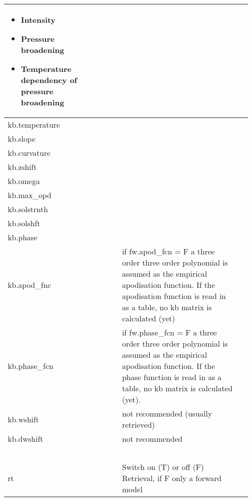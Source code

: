 \documentclass{article}
\newcommand\liststyleWWviiiNumii{%
\renewcommand\labelitemi{{\textbullet}}
\renewcommand\labelitemii{${\circ}$}
\renewcommand\labelitemiii{${\blacksquare}$}
\renewcommand\labelitemiv{{\textbullet}}
}
\begin{document}
{\begin{flushleft}
\begin{supertabular}{|m{2.10666in}|m{1.7969599in}|m{0.6087598in}m{0.54345983in}|m{5.30046in}|m{0.74065983in}|}
\liststyleWWviiiNumii
\begin{itemize}
\item {\ttfamily Intensity}
\item {\ttfamily Pressure broadening}
\item {\ttfamily Temperature dependency of pressure broadening}
\end{itemize}
 &
~
\\\hline
{\ttfamily kb.temperature} &
~
 &
 &
~
 &
~
\\\hline
{\ttfamily kb.slope} &
~
 &
 &
~
 &
~
\\\hline
{\ttfamily kb.curvature} &
~
 &
 &
~
 &
~
\\\hline
{\ttfamily kb.zshift} &
~
 &
 &
~
 &
~
\\\hline
{\ttfamily kb.omega} &
~
 &
 &
~
 &
~
\\\hline
{\ttfamily kb.max\_opd} &
~
 &
 &
~
 &
~
\\\hline
{\ttfamily kb.solstrnth} &
~
 &
 &
~
 &
~
\\\hline
{\ttfamily kb.solshft} &
~
 &
 &
~
 &
~
\\\hline
{\ttfamily kb.phase} &
~
 &
 &
~
 &
~
\\\hline
{\ttfamily kb.apod\_fnc} &
~
 &
 &
{\ttfamily if fw.apod\_fcn = F a three order three order polynomial is assumed as the empirical
apodisation function. If the apodisation function is read in as a table, no kb matrix is calculated (yet)} &
~
\\\hline
{\ttfamily kb.phase\_fcn} &
~
 &
 &
{\ttfamily if fw.phase\_fcn = F a three order three order polynomial is assumed as the empirical
apodisation function. If the phase function is read in as a table, no kb matrix is calculated (yet).} &
~
\\\hline
{\ttfamily kb.wshift} &
~
 &
 &
{\ttfamily not recommended (usually retrieved)} &
~
\\\hline
{\ttfamily kb.dwshift} &
~
 &
 &
{\ttfamily not recommended} &
~
\\\hline
{} &
~
\\\hline
{\ttfamily rt} &
~
 &
 &
{\ttfamily Switch on (T) or off (F) Retrieval, if F only a forward model}


\end{supertabular}
\end{flushleft}}
\end{document}
